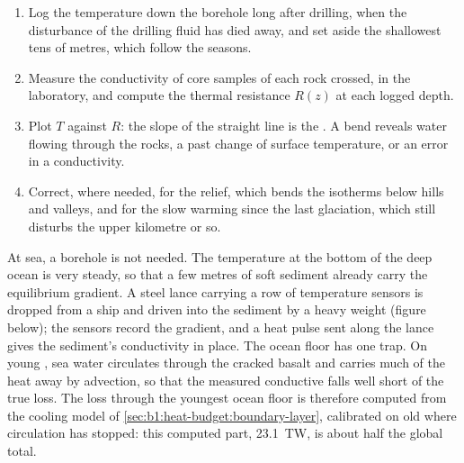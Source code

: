 \begin{method}\label{met:b1:heat-budget:borehole}
\begin{enumerate}
  \item Log the temperature down the borehole long after drilling, when the
        disturbance of the drilling fluid has died away, and set aside the
        shallowest tens of metres, which follow the seasons.
  \item Measure the conductivity of core samples of each rock crossed, in the
        laboratory, and compute the thermal resistance $R(z)$ at each logged
        depth.
  \item Plot $T$ against $R$: the slope of the straight line is the .
        A bend reveals water flowing through the rocks, a past change of
        surface temperature, or an error in a conductivity.
  \item Correct, where needed, for the relief, which bends the isotherms
        below hills and valleys, and for the slow warming since the last
        glaciation, which still disturbs the upper kilometre or so.
\end{enumerate}
\end{method}

At sea, a borehole is not needed. The temperature at the bottom of the deep
ocean is very steady, so that a few metres of soft sediment already carry the
equilibrium gradient. A steel lance carrying a row of temperature sensors is
dropped from a ship and driven into the sediment by a heavy weight
(figure below); the sensors record the gradient, and a
heat pulse sent along the lance gives the sediment's conductivity in place.
The ocean floor has one trap. On young , sea water circulates through the
cracked basalt and carries much of the heat away by advection, so that the
measured conductive  falls well short of the true loss. The loss
through the youngest ocean floor is therefore computed from the cooling model
of \cref{sec:b1:heat-budget:boundary-layer}, calibrated on old  where
circulation has stopped: this computed part, \qty{23.1}{TW}, is about half
the global total. %

